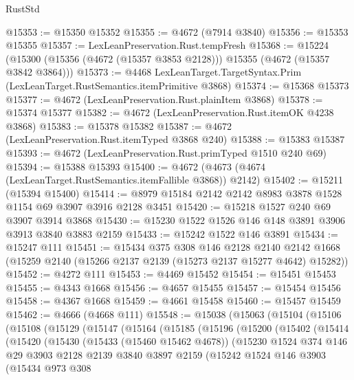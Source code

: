 \begin{lexlean}{RustStd}
\begin{coremodule}
@15353 := @15350 @15352
@15355 := @4672 (@7914 @3840)
@15356 := @15353 @15355
@15357 := LexLeanPreservation.Rust.tempFresh
@15368 := @15224 (@15300 (@15356 (@4672 (@15357 @3853 @2128))) @15355 (@4672 (@15357 @3842 @3864)))
@15373 := @4468 LexLeanTarget.TargetSyntax.Prim (LexLeanTarget.RustSemantics.itemPrimitive @3868)
@15374 := @15368 @15373
@15377 := @4672 (LexLeanPreservation.Rust.plainItem @3868)
@15378 := @15374 @15377
@15382 := @4672 (LexLeanPreservation.Rust.itemOK @4238 @3868)
@15383 := @15378 @15382
@15387 := @4672 (LexLeanPreservation.Rust.itemTyped @3868 @240)
@15388 := @15383 @15387
@15393 := @4672 (LexLeanPreservation.Rust.primTyped @1510 @240 @69)
@15394 := @15388 @15393
@15400 := @4672 (@4673 (@4674 (LexLeanTarget.RustSemantics.itemFallible @3868)) @2142)
@15402 := @15211 (@15394 @15400)
@15414 := @8979 @15184 @2142 @2142 @8983 @3878 @1528 @1154 @69 @3907 @3916 @2128 @3451
@15420 := @15218 @1527 @240 @69 @3907 @3914 @3868
@15430 := @15230 @1522 @1526 @146 @148 @3891 @3906 @3913 @3840 @3883 @2159
@15433 := @15242 @1522 @146 @3891
@15434 := @15247 @111
@15451 := @15434
    @375
    @308
    @146
    @2128
    @2140
    @2142
    @1668
    (@15259 @2140 (@15266 @2137 @2139 (@15273 @2137 @15277 @4642) @15282))
@15452 := @4272 @111
@15453 := @4469 @15452
@15454 := @15451 @15453
@15455 := @4343 @1668
@15456 := @4657 @15455
@15457 := @15454 @15456
@15458 := @4367 @1668
@15459 := @4661 @15458
@15460 := @15457 @15459
@15462 := @4666 (@4668 @111)
@15548 := @15038
    (@15063
      (@15104
        (@15106
          (@15108
            (@15129
              (@15147
                (@15164
                  (@15185
                    (@15196
                      (@15200
                        (@15402
                          (@15414
                            (@15420
                              (@15430
                                (@15433 (@15460 @15462 @4678))
                                (@15230
                                  @1524
                                  @374
                                  @146
                                  @29
                                  @3903
                                  @2128
                                  @2139
                                  @3840
                                  @3897
                                  @2159
                                  (@15242
                                    @1524
                                    @146
                                    @3903
                                    (@15434
                                      @973
                                      @308

\end{coremodule}
\end{lexlean}
